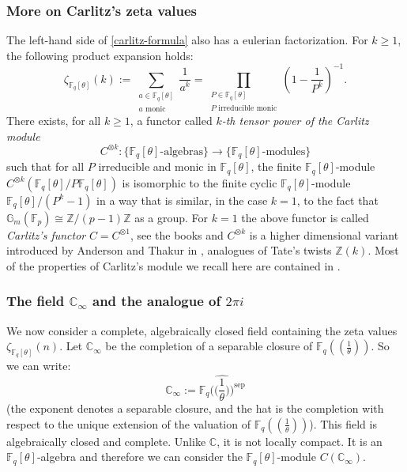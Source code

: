 \documentclass[11pt]{amsart}
\numberwithin{equation}{section}
\newcommand{\ZZ}{\mathbb{Z}}
\newcommand{\FF}{\mathbb{F}}
\newcommand{\CC}{\mathbb{C}}
\newcommand{\GG}{\mathbb{G}}
\begin{document}
\subsubsection*{More on Carlitz's zeta values}
The left-hand side of \eqref{carlitz-formula} also has a eulerian factorization. For $k\geq 1$, the following product expansion holds:
\begin{equation}\label{carlitz-zeta-values}
\zeta_{\FF_q[\theta]}(k):=\sum_{\begin{smallmatrix}a\in\FF_q[\theta]\\ \text{$a$ monic}\end{smallmatrix}}\frac{1}{a^k}=
\prod_{\begin{smallmatrix}P\in\FF_q[\theta]\\ \text{$P$ irreducible monic}\end{smallmatrix}}\left(1-\frac{1}{P^k}\right)^{-1}.
\end{equation}
There exists, for all $k\geq 1$, a functor called {\em $k$-th tensor power of the Carlitz module}
$$C^{\otimes k}:\{\FF_q[\theta]\text{-algebras}\}\rightarrow\{\FF_q[\theta]\text{-modules}\}$$ such that for all $P$ irreducible and monic in $\FF_q[\theta]$, the finite $\FF_q[\theta]$-module
$C^{\otimes k}(\FF_q[\theta]/P\FF_q[\theta])$ is isomorphic to the finite cyclic $\FF_q[\theta]$-module $\FF_q[\theta]/(P^k-1)$ in a way that is similar, in the case $k=1$, to the fact that $\GG_m(\FF_p)\cong\ZZ/(p-1)\ZZ$ as a group. For $k=1$ the above functor is called {\em Carlitz's functor} $C=C^{\otimes1}$, see the books \cite{GOS,PAPI} and $C^{\otimes k}$ is a higher dimensional variant introduced by Anderson and Thakur in \cite{AND&THA}, analogues of Tate's twists $\ZZ(k)$. Most of the properties of Carlitz's module we recall here are contained in \cite[\S 4.4]{PEL5}.

\subsubsection*{The field $\CC_\infty$ and the analogue of $2\pi i$}
We now consider a complete, algebraically closed field containing the zeta values $\zeta_{\FF_q[\theta]}(n)$.
Let $\CC_\infty$ be the completion of a separable closure of $\FF_q((\frac{1}{\theta}))$. So we can write:
$$\CC_\infty:=\widehat{\FF_q\Big(\!\Big(\frac{1}{\theta}\Big)\!\Big)^{\text{sep}}}$$
(the exponent denotes a separable closure, and the hat is the completion with respect to the unique extension of
the valuation of $\FF_q(\!(\frac{1}{\theta})\!)$). This field is algebraically closed and complete. Unlike $\CC$, it is not locally compact.
It is an
$\FF_q[\theta]$-algebra and therefore we can consider the $\FF_q[\theta]$-module $C(\CC_\infty)$. 
\end{document}

